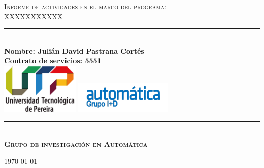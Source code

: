\vspace*{0.5cm}
\begin{center}
	\newcommand{\HRule}{\rule{\linewidth}{0.5mm}}
	\vspace*{-1.5cm}
	\textsc{\LARGE Informe de actividades en el marco del programa: \\ 
		\vspace{0.4cm}
		XXXXXXXXXXX}\\
	\vspace{2cm}
	\HRule \\[0.4cm]
	{ \bfseries Nombre: Julián David Pastrana Cortés }\\[0.4cm]
	{ \bfseries Contrato de servicios: 5551 }\\[0.4cm]
	\vspace{1.5cm}
	\includegraphics[width=0.28\textwidth]{imagenes/LogoU.png}
	\includegraphics[width=0.35\textwidth]{imagenes/logo_automatica.png}
	\HRule \\[1.5cm]
	\vspace{1.5cm}
	\vspace*{0.5cm}
	\textsc{\textbf{\Large Grupo de investigación en Automática } }\\
	\vspace{3.5cm} 
	\begin{center}
		{\large \today}
	\end{center}
\end{center}
\newpage
